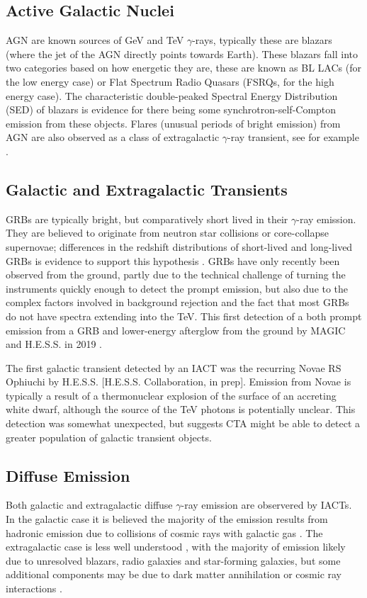 \subsection{Active Galactic Nuclei}
AGN are known sources of GeV and TeV $\gamma$-rays, typically these are blazars (where the jet of the AGN directly points towards Earth). These blazars fall into two categories based on how energetic they are, these are known as BL LACs (for the low energy case) or Flat Spectrum Radio Quasars (FSRQs, for the high energy case). The characteristic double-peaked Spectral Energy Distribution (SED) of blazars is evidence for there being some synchrotron-self-Compton emission from these objects. Flares (unusual periods of bright emission) from AGN are also observed as a class of extragalactic $\gamma$-ray transient, see for example \cite{TXS}.

\subsection{Galactic and Extragalactic Transients}
GRBs are typically bright, but comparatively short lived in their $\gamma$-ray emission. They are believed to originate from neutron star collisions or core-collapse supernovae; differences in the redshift distributions of short-lived and long-lived GRBs is evidence to support this hypothesis \cite{longair}. GRBs have only recently been observed from the ground, partly due to the technical challenge of turning the instruments quickly enough to detect the prompt emission, but also due to the complex factors involved in background rejection and the fact that most GRBs do not have spectra extending into the TeV. This first detection of a both prompt emission from a GRB and lower-energy afterglow from the ground by MAGIC and H.E.S.S. in 2019 \cite{magicGRB}.

The first galactic transient detected by an IACT was the recurring Novae RS Ophiuchi by H.E.S.S. [H.E.S.S. Collaboration, in prep]. Emission from Novae is typically a result of a thermonuclear explosion of the surface of an accreting white dwarf, although the source of the TeV photons is potentially unclear. This detection was somewhat unexpected, but suggests CTA might be able to detect a greater population of galactic transient objects.

\subsection{Diffuse Emission}
Both galactic and extragalactic diffuse $\gamma$-ray emission are observered by IACTs. In the galactic case it is believed the majority of the emission results from hadronic emission due to collisions of cosmic rays with galactic gas \cite{extragamma}. The extragalactic case is less well understood \cite{extragamma}, with the majority of emission likely due to unresolved blazars, radio galaxies and star-forming galaxies, but some additional components may be due to dark matter annihilation or cosmic ray interactions \cite{extragamma}.

